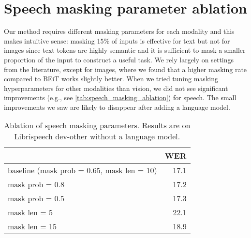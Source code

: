 \documentclass[nohyperref]{article}
\theoremstyle{plain}
\theoremstyle{definition}
\theoremstyle{remark}
\begin{document}
\section{Speech masking parameter ablation}

Our method requires different masking parameters for each modality and this makes intuitive sense: masking 15\% of inputs is effective for text but not for images since text tokens are highly semantic and it is sufficient to mask a smaller proportion of the input to construct a useful task.
We rely largely on settings from the literature, except for images, where we found that a higher masking rate compared to BEiT works slightly better.
When we tried tuning masking hyperparameters for other modalities than vision, we did not see significant improvements (e.g., see \autoref{tab:speech_masking_ablation}) for speech. 
The small improvements we saw are likely to disappear after adding a language model.

\begin{table}[h]
\centering
\caption{Ablation of speech masking parameters. Results are on Librispeech dev-other without a language model. 
\label{tab:speech_masking_ablation}}
\begin{tabular}[t]{lr}
\toprule
& WER \\
\midrule
baseline (mask prob = 0.65, mask len = 10) & 17.1 \\
mask prob = 0.8 & 17.2 \\
mask prob = 0.5 & 17.3 \\
mask len = 5 & 22.1 \\
mask len = 15 & 18.9 \\
\bottomrule
\end{tabular}
\end{table}
\end{document}
